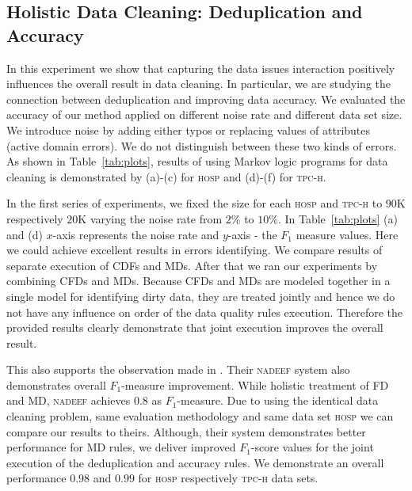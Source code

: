 \subsection{Holistic Data Cleaning: Deduplication and Accuracy}
\label{subsec:exp1}
In this experiment we show that capturing the data issues interaction positively influences the overall result in data cleaning. In particular, we are studying the connection between deduplication and improving data accuracy. We evaluated the accuracy of our method applied on different noise rate and different data set size. We introduce noise by adding either typos or replacing values of attributes (active domain errors). We do not distinguish between these two kinds of errors. As shown in Table~\ref{tab:plots}, results of using Markov logic programs for data cleaning is demonstrated by (a)-(c) for \textsc{hosp} and (d)-(f) for \textsc{tpc-h}. %

In the first series of experiments, we fixed the size for each \textsc{hosp} and \textsc{tpc-h} to $90$K respectively $20$K varying the noise rate from $2\%$ to $10\%$. In Table~\ref{tab:plots} (a) and (d) $x$-axis represents the noise rate and $y$-axis - the $F_1$ measure values. Here we could achieve excellent results in errors identifying. We compare results of separate execution of CDFs and MDs. After that we ran our experiments by combining CFDs and MDs. Because CFDs and MDs are modeled together in a single model for identifying dirty data, they are treated jointly and hence we do not have any influence on order of the data quality rules execution. Therefore the provided results clearly demonstrate that joint execution improves the overall result. 

This also supports the observation made in \cite{Dallachiesa:2013:NCD:2463676.2465327}. Their \textsc{nadeef} system also demonstrates overall $F_1$-measure improvement. While holistic treatment of FD and MD, \textsc{nadeef} achieves $0.8$ as $F_1$-measure. Due to using the identical data cleaning problem, same evaluation methodology and same data set \textsc{hosp} we can compare our results to theirs. Although, their system demonstrates better performance for MD rules, we deliver improved $F_1$-score values for the joint execution of the deduplication and accuracy rules. We demonstrate an overall performance $0.98$ and $0.99$ for \textsc{hosp} respectively \textsc{tpc-h} data sets.   

